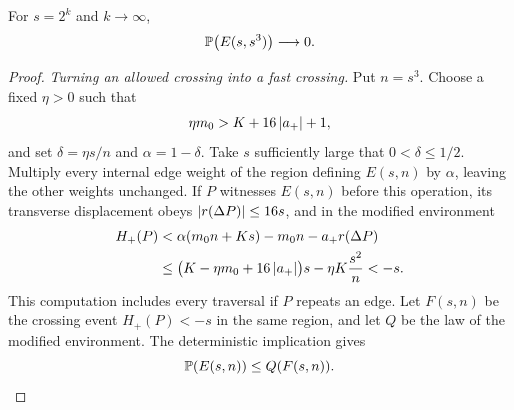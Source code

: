 \begin{lemma}\label{df:gr:tilt}
For $s=2^k$ and $k\to\infty$,
\[
 \mathbb P\bigl(E(s,s^3)\bigr)\longrightarrow0.
\]
\end{lemma}
\begin{proof}
\emph{Turning an allowed crossing into a fast crossing.}
Put $n=s^3$. Choose a fixed $\eta>0$ such that
\[
 \eta m_0>K+16\left\lvert a_+\right\rvert+1,
\]
and set $\delta=\eta s/n$ and $\alpha=1-\delta$. Take $s$ sufficiently
large that $0<\delta\le1/2$. Multiply every internal edge weight of the
region defining $E(s,n)$ by $\alpha$, leaving the other weights
unchanged. If $P$ witnesses $E(s,n)$ before this operation, its
transverse displacement obeys $\left\lvert r(\Delta P)\right\rvert\le16s$, and in the
modified environment
\[
 \begin{split}
 H_+(P)
 &<\alpha(m_0n+Ks)-m_0n-a_+r(\Delta P)\\
 &\le \bigl(K-\eta m_0+16\left\lvert a_+\right\rvert\bigr)s
          -\eta K\frac{s^2}{n}<-s.
 \end{split}
\]
This computation includes every traversal if $P$ repeats an edge.
Let $F(s,n)$ be the crossing event $H_+(P)<-s$ in the same region, and
let $Q$ be the law of the modified environment. The deterministic
implication gives
\begin{equation}\label{df:eq:gr-tilt-implication}
 \mathbb P(E(s,n))\le Q(F(s,n)).
\end{equation}


\end{proof}
